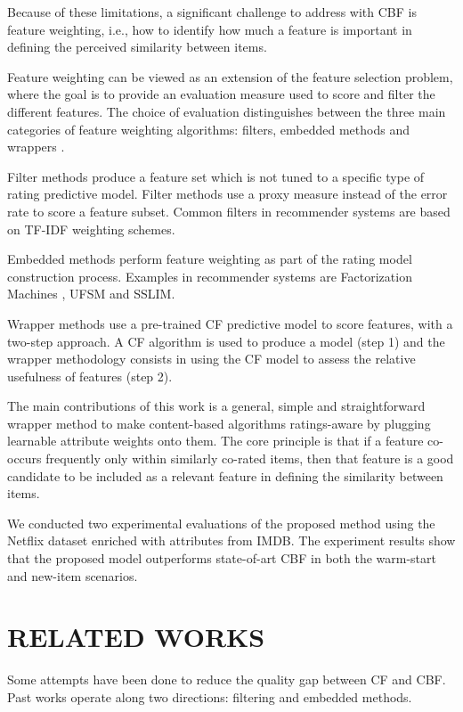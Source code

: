 \documentclass{sig-alternate}
\begin{document}
Because of these limitations, a significant challenge to address
with CBF is feature weighting, i.e., how to identify how much a
feature is important in defining the perceived similarity between
items.

Feature weighting can be viewed as an extension of the feature
selection problem, where the goal is to provide an evaluation measure
used to score and filter the different features. The choice of
evaluation distinguishes between the three main categories of feature
weighting algorithms: filters, embedded methods and wrappers
\cite{2}.

Filter methods produce a feature set which is not tuned to a
specific type of rating predictive model. Filter methods use a proxy
measure instead of the error rate to score a feature subset. Common
filters in recommender systems are based on TF-IDF weighting
schemes.

Embedded methods perform feature weighting as part of the rating
model construction process. Examples in recommender systems
are Factorization Machines \cite{5}, UFSM \cite{1} and SSLIM.

Wrapper methods use a pre-trained CF predictive model to score
features, with a two-step approach. A CF algorithm is used to
produce a model (step 1) and the wrapper methodology consists
in using the CF model to assess the relative usefulness of features
(step 2).

The main contributions of this work is a general, simple and
straightforward wrapper method to make content-based algorithms
ratings-aware by plugging learnable attribute weights onto them.
The core principle is that if a feature co-occurs frequently only
within similarly co-rated items, then that feature is a good candidate
to be included as a relevant feature in defining the similarity
between items.

We conducted two experimental evaluations of the proposed 
method using the Netflix dataset enriched with attributes from 
IMDB. The experiment results show that the proposed model outperforms
state-of-art CBF in both the warm-start and new-item 
scenarios. 

\section{RELATED WORKS}

Some attempts have been done to reduce the quality gap between
CF and CBF. Past works operate along two directions: filtering and
embedded methods.
\end{document}
